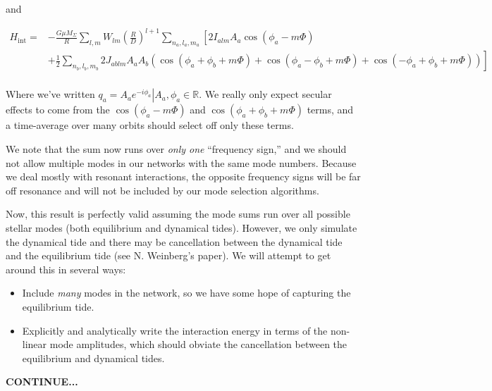 and

\begin{subequations}
\begin{align}
H_{\mathrm{int}}  = & - \frac{G \mu M_{\Sigma}}{R} \sum_{l,m} W_{lm} \left(\frac{R}{D}\right)^{l+1} \sum_{n_a, l_a, m_a} \left[ 2I_{alm}A_a\cos(\phi_a - m\Phi) \right. \\
                    & \left. + \frac{1}{2}\sum_{n_b,l_b,m_b} 2J_{ablm}A_a A_b\left( \cos(\phi_a + \phi_b + m\Phi) +\cos(\phi_a - \phi_b + m\Phi) + \cos(-\phi_a + \phi_b + m\Phi)\right) \right]\\
\end{align}
\end{subequations}

Where we've written $q_a = A_a e^{-i\phi_a} \left| A_a,\phi_a \in \mathbb{R} \right.$. We really only expect secular effects to come from the $\cos(\phi_a - m\Phi)$ and $\cos(\phi_a+\phi_b+m\Phi)$ terms, and a time-average over many orbits should select off only these terms.

We note that the sum now runs over \emph{only one} ``frequency sign,'' and we should not allow multiple modes in our networks with the same mode numbers. Because we deal mostly with resonant interactions, the opposite frequency signs will be far off resonance and will not be included by our mode selection algorithms.

Now, this result is perfectly valid assuming the mode sums run over all possible stellar modes (both equilibrium and dynamical tides). However, we only simulate the dynamical tide and there may be cancellation between the dynamical tide and the equilibrium tide (see N. Weinberg's paper). We will attempt to get around this in several ways:
\begin{itemize}
  \item{Include \emph{many} modes in the network, so we have some hope of capturing the equilibrium tide.}
  \item{Explicitly and analytically write the interaction energy in terms of the non-linear mode amplitudes, which should obviate the cancellation between the equilibrium and dynamical tides.}
\end{itemize}



\textbf{CONTINUE...}
